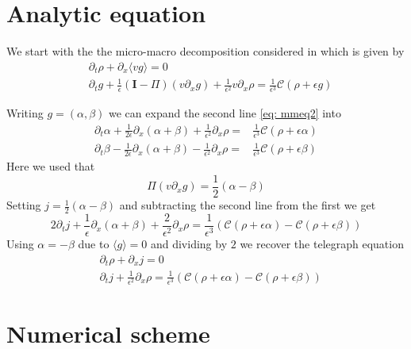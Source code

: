 \documentclass[]{article}
\title{}
\author{}
\begin{document}
\maketitle

\section{Analytic equation}

We start with the the micro-macro decomposition considered in \cite{JaLiQiXi2014} which is given by
\begin{subequations}
\begin{align}
& \partial_t \rho + \partial_x \langle v g \rangle = 0 \label{eq: mmeq1} \\
& \partial_t g + \frac{1}{\epsilon} (\mathbf{I} - \Pi) (v \partial_x g) + \frac{1}{\epsilon^2} v \partial_x \rho= \frac{1}{\epsilon^3} \mathcal{C}(\rho + \epsilon g) \label{eq: mmeq2}
\end{align}
\end{subequations}

Writing $g = (\alpha, \beta)$ we can expand the second line \eqref{eq: mmeq2} into
\begin{align*}
\partial_t \alpha + \frac{1}{2 \epsilon} \partial_x (\alpha + \beta)+ \frac{1}{\epsilon^2} \partial_x \rho = & \frac{1}{\epsilon^3} \mathcal{C}(\rho + \epsilon \alpha)\\
\partial_t \beta - \frac{1}{2\epsilon} \partial_x (\alpha + \beta)- \frac{1}{\epsilon^2} \partial_x \rho = & \frac{1}{\epsilon^3} \mathcal{C}(\rho + \epsilon \beta)
\end{align*}
Here we used that
\[
\Pi (v \partial_x g) = \frac{1}{2}(\alpha - \beta)
\]
Setting $j = \frac{1}{2}(\alpha - \beta)$ and subtracting the second line from the first we get
\[
2 \partial_t j + \frac{1}{\epsilon} \partial_x (\alpha + \beta) + \frac{2}{\epsilon^2} \partial_x \rho = \frac{1}{\epsilon^3} (\mathcal{C}(\rho + \epsilon \alpha) - \mathcal{C}(\rho + \epsilon \beta)) 
\]
Using $\alpha = -\beta$ due to $\langle g \rangle = 0$ and dividing by $2$ we recover the telegraph equation
\begin{align*}
& \partial_t \rho + \partial_x j = 0\\
& \partial_t j + \frac{1}{\epsilon^2} \partial_x \rho = \frac{1}{\epsilon^3} (\mathcal{C}(\rho + \epsilon \alpha) - \mathcal{C}(\rho + \epsilon \beta)) 
\end{align*}

\section{Numerical scheme}
\end{document}
